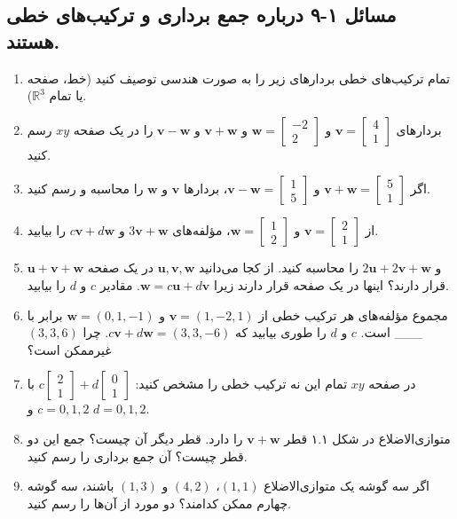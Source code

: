 \documentclass[12pt, a4paper]{book}
\begin{document}
	\subsection*{مسائل ۱-۹ درباره جمع برداری و ترکیب‌های خطی هستند.}
	\begin{enumerate}
		\item تمام ترکیب‌های خطی بردارهای زیر را به صورت هندسی توصیف کنید (خط، صفحه یا تمام $\mathbb{R}^3$).
		\item بردارهای $\mathbf{v}=\begin{bmatrix} 4 \\ 1 \end{bmatrix}$ و $\mathbf{w}=\begin{bmatrix} -2 \\ 2 \end{bmatrix}$ و $\mathbf{v}+\mathbf{w}$ و $\mathbf{v}-\mathbf{w}$ را در یک صفحه $xy$ رسم کنید.
		\item اگر $\mathbf{v}+\mathbf{w}=\begin{bmatrix} 5 \\ 1 \end{bmatrix}$ و $\mathbf{v}-\mathbf{w}=\begin{bmatrix} 1 \\ 5 \end{bmatrix}$، بردارها $\mathbf{v}$ و $\mathbf{w}$ را محاسبه و رسم کنید.
		\item از $\mathbf{v}=\begin{bmatrix} 2 \\ 1 \end{bmatrix}$ و $\mathbf{w}=\begin{bmatrix} 1 \\ 2 \end{bmatrix}$، مؤلفه‌های $3\mathbf{v}+\mathbf{w}$ و $c\mathbf{v}+d\mathbf{w}$ را بیابید.
		\item $\mathbf{u}+\mathbf{v}+\mathbf{w}$ و $2\mathbf{u}+2\mathbf{v}+\mathbf{w}$ را محاسبه کنید. از کجا می‌دانید $\mathbf{u, v, w}$ در یک صفحه قرار دارند؟ اینها در یک صفحه قرار دارند زیرا $\mathbf{w} = c\mathbf{u}+d\mathbf{v}$. مقادیر $c$ و $d$ را بیابید.
		\item مجموع مؤلفه‌های هر ترکیب خطی از $\mathbf{v}=(1,-2,1)$ و $\mathbf{w}=(0,1,-1)$ برابر با \_\_\_ است. $c$ و $d$ را طوری بیابید که $c\mathbf{v}+d\mathbf{w}=(3,3,-6)$. چرا $(3,3,6)$ غیرممکن است؟
		\item در صفحه $xy$ تمام این نه ترکیب خطی را مشخص کنید: $c\begin{bmatrix} 2 \\ 1 \end{bmatrix} + d\begin{bmatrix} 0 \\ 1 \end{bmatrix}$ با $c=0,1,2$ و $d=0,1,2$.
		\item متوازی‌الاضلاع در شکل ۱.۱ قطر $\mathbf{v}+\mathbf{w}$ را دارد. قطر دیگر آن چیست؟ جمع این دو قطر چیست؟ آن جمع برداری را رسم کنید.
		\item اگر سه گوشه یک متوازی‌الاضلاع $(1,1)$، $(4,2)$ و $(1,3)$ باشند، سه گوشه چهارم ممکن کدامند؟ دو مورد از آن‌ها را رسم کنید.
	\end{enumerate}
	
\end{document}
